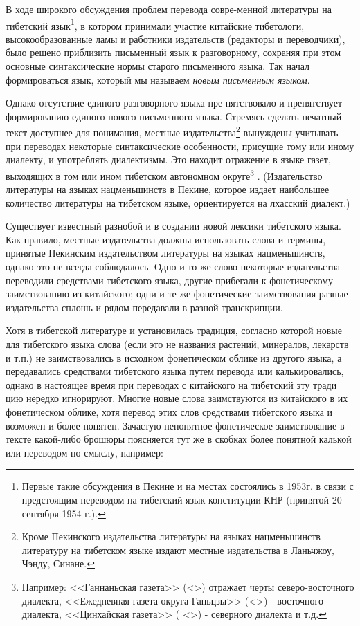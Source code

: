 В ходе широкого обсуждения проблем перевода совре-менной литературы на тибетский язык\footnote[6]{Первые такие обсуждения в Пекине и на местах состоялись в 1953г. в связи с предстоящим переводом на тибетский язык конституции КНР (принятой 20 сентября 1954 г.).}, в котором принимали участие китайские тибетологи, высокообразованные ламы и работники издательств (редакторы и переводчики), было решено приблизить письменный язык к разговорному, сохраняя при этом основные синтаксические нормы старого письменного языка. Так начал формироваться язык, который мы называем \emph{новым письменным языком}.

Однако отсутствие единого разговорного языка пре-пятствовало и препятствует формированию единого нового письменного языка. Стремясь сделать печатный текст доступнее для понимания, местные издательства\footnote[7]{Кроме Пекинского издательства литературы на языках нацменьшинств литературу на тибетском языке издают местные издательства в Ланьчжоу, Чэнду, Синане.} вынуждены учитывать при переводах некоторые синтаксические особенности, присущие тому или иному диалекту, и употреблять диалектизмы. Это находит отражение в языке газет, выходящих в том или ином тибетском автономном округе\footnote[8]{Например: <<Ганнаньская газета>> (<>) отражает черты северо-восточного диалекта, <<Ежедневная газета округа Ганьцзы>> (<>) - восточного диалекта, <<Цинхайская газета>> ( <>) - северного диалекта и т.д.} . (Издательство литературы на языках нацменьшинств в Пекине, которое издает наибольшее количество литературы на тибетском языке, ориентируется на лхасский диалект.)

Существует известный разнобой и в создании новой лексики тибетского языка. Как правило, местные издательства должны использовать слова и термины, принятые Пекинским издательством литературы на языках нацменьшинств, однако это не всегда соблюдалось. Одно и то же слово некоторые издательства переводили средствами тибетского языка, другие прибегали к фонетическому заимствованию из китайского; одни и те же фонетические заимствования разные издательства сплошь и рядом передавали в разной транскрипции.

Хотя в тибетской литературе и установилась традиция, согласно которой новые для тибетского языка слова (если это не названия растений, минералов, лекарств и т.п.) не заимствовались в исходном фонетическом облике из другого языка, а передавались средствами тибетского языка путем перевода или калькировались, однако в настоящее время при переводах с китайского на тибетский эту тради цию нередко игнорируют. Многие новые слова заимствуются из китайского в их фонетическом облике, хотя перевод этих слов средствами тибетского языка и возможен и более понятен. Зачастую непонятное фонетическое заимствование в тексте какой-либо брошюры поясняется тут же в скобках более понятной калькой или переводом по смыслу, например:

